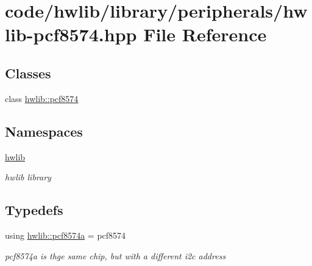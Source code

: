 \hypertarget{hwlib-pcf8574_8hpp}{}\section{code/hwlib/library/peripherals/hwlib-\/pcf8574.hpp File Reference}
\label{hwlib-pcf8574_8hpp}
\subsection*{Classes}
\begin{DoxyCompactItemize}
\item 
class \hyperlink{classhwlib_1_1pcf8574}{hwlib\+::pcf8574}
\end{DoxyCompactItemize}
\subsection*{Namespaces}
\begin{DoxyCompactItemize}
\item 
 \hyperlink{namespacehwlib}{hwlib}
\begin{DoxyCompactList}\small\item\em hwlib library \end{DoxyCompactList}\end{DoxyCompactItemize}
\subsection*{Typedefs}
\begin{DoxyCompactItemize}
\item 
\mbox{\label{namespacehwlib_a1de5a49c6b1b8cd371e5444684018976}} 
using \hyperlink{namespacehwlib_a1de5a49c6b1b8cd371e5444684018976}{hwlib\+::pcf8574a} = pcf8574
\begin{DoxyCompactList}\small\item\em pcf8574a is thge same chip, but with a different i2c address \end{DoxyCompactList}\end{DoxyCompactItemize}
